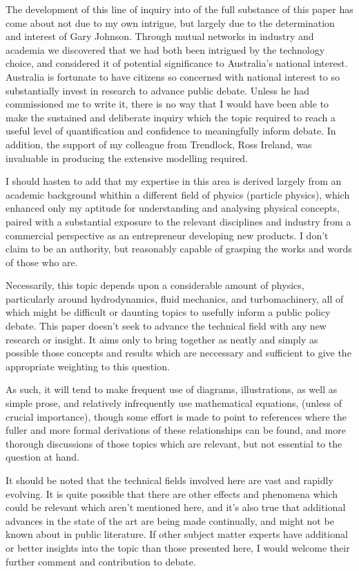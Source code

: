 \documentclass{article}\usepackage[]{graphicx}\usepackage[]{color}
\begin{document}
The development of this line of inquiry into of the full substance of this paper has come about not due to my own intrigue, but largely due to the determination and interest of Gary Johnson.  Through mutual networks in industry and academia we discovered that we had both been intrigued by the technology choice, and considered it of potential significance to Australia's national interest. Australia is fortunate to have citizens so concerned with national interest to so substantially invest in research to advance public debate.  Unless he had commissioned me to write it, there is no way that I would have been able to make the sustained and deliberate inquiry which the topic required to reach a useful level of quantification and confidence to meaningfully inform debate.  In addition, the support of my colleague from Trendlock, Ross Ireland, was invaluable in producing the extensive modelling required.

I should hasten to add that my expertise in this area is derived largely from an academic background whithin a different field of physics (particle physics), which enhanced only my aptitude for understanding and analysing physical concepts, paired with a substantial exposure to the relevant disciplines and industry from a commercial perspective as an entrepreneur developing new products.  I don't claim to be an authority, but reasonably capable of grasping the works and words of those who are.

Necessarily, this topic depends upon a considerable amount of physics, particularly around hydrodynamics, fluid mechanics, and turbomachinery, all of which might be difficult or daunting topics to usefully inform a public policy debate.  This paper doesn't seek to advance the technical field with any new research or insight.  It aims only to bring together as neatly and simply as possible those concepts and results which are neccessary and sufficient to give the appropriate weighting to this question.

As such, it will tend to make frequent use of diagrams, illustrations, as well as simple prose, and relatively infrequently use mathematical equations, (unless of crucial importance), though some effort is made to point to references where the fuller and more formal derivations of these relationships can be found, and more thorough discussions of those topics which are relevant, but not essential to the question at hand.

It should be noted that the technical fields involved here are vast and rapidly evolving.  It is quite possible that there are other effects and phenomena which could be relevant which aren't mentioned here, and it's also true that additional advances in the state of the art are being made continually, and might not be known about in public literature.  If other subject matter experts have additional or better insights into the topic than those presented here, I would welcome their further comment and contribution to debate.
\end{document}
